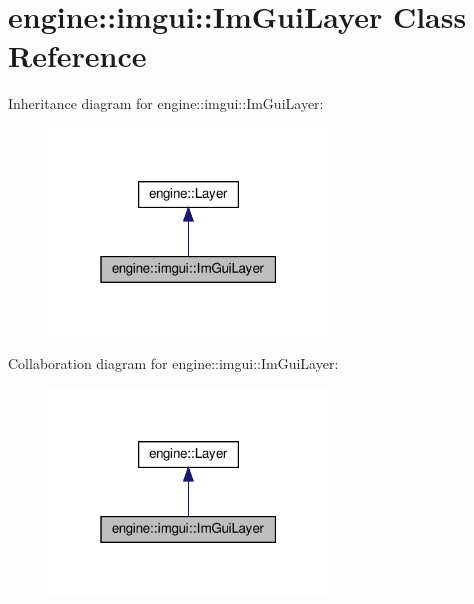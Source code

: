 \hypertarget{classengine_1_1imgui_1_1ImGuiLayer}{}\section{engine\+:\+:imgui\+:\+:Im\+Gui\+Layer Class Reference}
\label{classengine_1_1imgui_1_1ImGuiLayer}


Inheritance diagram for engine\+:\+:imgui\+:\+:Im\+Gui\+Layer\+:
\nopagebreak
\begin{figure}[H]
\begin{center}
\leavevmode
\includegraphics[width=211pt]{classengine_1_1imgui_1_1ImGuiLayer__inherit__graph}
\end{center}
\end{figure}


Collaboration diagram for engine\+:\+:imgui\+:\+:Im\+Gui\+Layer\+:
\nopagebreak
\begin{figure}[H]
\begin{center}
\leavevmode
\includegraphics[width=211pt]{classengine_1_1imgui_1_1ImGuiLayer__coll__graph}
\end{center}
\end{figure}
